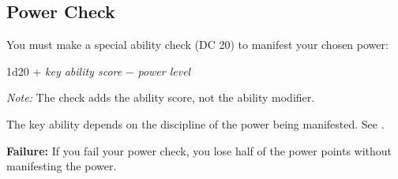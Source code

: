 \subsection{Power Check}
You must make a special ability check (DC 20) to manifest your chosen power:

\begin{Formula}{1d20 + \textit{key ability score} $-$ \textit{power level}}
\end{Formula}

\textit{Note:} The check adds the ability score, not the ability modifier.

The key ability depends on the discipline of the power being manifested. See .


\textbf{Failure:} If you fail your power check, you lose half of the power points without manifesting the power.